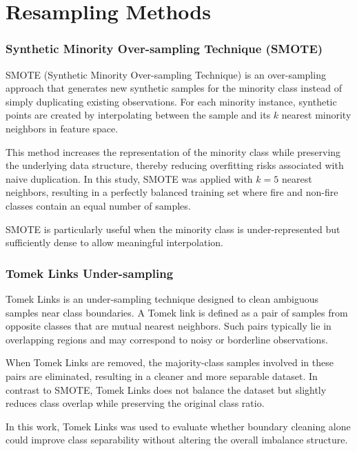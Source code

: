 \section{Resampling Methods}\label{annexe:resampling_methods}

\subsubsection{Synthetic Minority Over-sampling Technique (SMOTE)}

SMOTE (Synthetic Minority Over-sampling Technique) is an over-sampling approach that generates new synthetic samples for the minority class instead of simply duplicating existing observations. For each minority instance, synthetic points are created by interpolating between the sample and its $k$ nearest minority neighbors in feature space.

This method increases the representation of the minority class while preserving the underlying data structure, thereby reducing overfitting risks associated with naive duplication. In this study, SMOTE was applied with $k=5$ nearest neighbors, resulting in a perfectly balanced training set where fire and non-fire classes contain an equal number of samples.

SMOTE is particularly useful when the minority class is under-represented but sufficiently dense to allow meaningful interpolation.

\subsubsection{Tomek Links Under-sampling}

Tomek Links is an under-sampling technique designed to clean ambiguous samples near class boundaries. A Tomek link is defined as a pair of samples from opposite classes that are mutual nearest neighbors. Such pairs typically lie in overlapping regions and may correspond to noisy or borderline observations.

When Tomek Links are removed, the majority-class samples involved in these pairs are eliminated, resulting in a cleaner and more separable dataset. In contrast to SMOTE, Tomek Links does not balance the dataset but slightly reduces class overlap while preserving the original class ratio.

In this work, Tomek Links was used to evaluate whether boundary cleaning alone could improve class separability without altering the overall imbalance structure.

